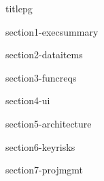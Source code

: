 \documentclass[table]{article}
\begin{document}
{titlepg}

\tableofcontents
\pagebreak

{section1-execsummary}

{section2-dataitems}

{section3-funcreqs}

{section4-ui}

{section5-architecture}

{section6-keyrisks}

{section7-projmgmt}
\end{document}
